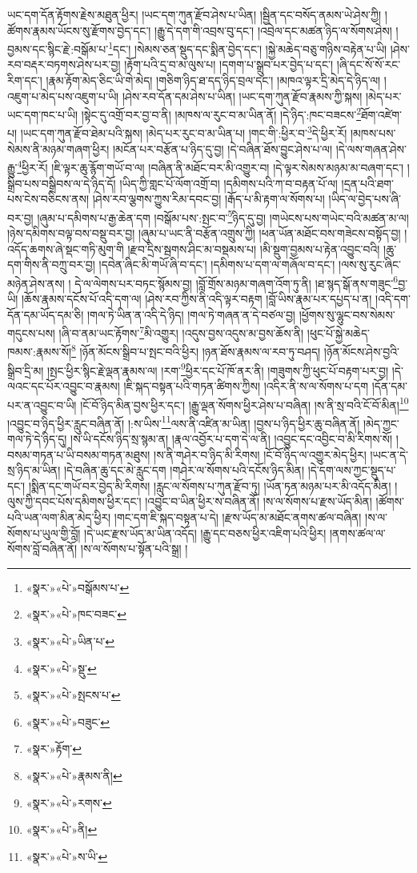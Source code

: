 ཡང་དག་དོན་རྟོགས་རྗེས་མཐུན་ཕྱིར། །ཡང་དག་ཀུན་རྫོབ་ཤེས་པ་ཡིན། །སྦྱིན་དང་བསོད་ནམས་ཡེ་ཤེས་ཀྱི། །ཚོགས་རྣམས་ཡོངས་སུ་རྫོགས་བྱེད་དང་། །རྒྱུ་དེ་དག་གི་འབྲས་བུ་དང་། །འབྲེལ་དང་མཚན་ཉིད་ལ་སོགས་ཤེས། །བྱམས་དང་སྙིང་རྗེ་:བསྒོམ་པ་\footnote{«སྣར་»«པེ་»བསྒོམས་པ་}དང་། །སེམས་ཅན་སྡུད་དང་སྨིན་བྱེད་དང་། །སྐྱེ་མཆེད་བཅུ་གཉིས་བརྟེན་པ་ཡི། །ཤེས་རབ་བརྡར་བཏགས་ཤེས་པར་བྱ། །རྟོག་པའི་དྲ་བ་མ་ལུས་པ། །དགག་པ་སྒྲུབ་པར་བྱེད་པ་དང་། །ཞི་དང་སོ་སོ་རང་རིག་དང་། །རྣམ་རྟོག་མེད་ཅིང་ཡི་གེ་མེད། །གཅིག་ཉིད་ཐ་དད་ཉིད་བྲལ་དང་། །མཁའ་ལྟར་དྲི་མེད་དེ་ཉིད་ལ། །འཇུག་པ་མེད་པས་འཇུག་པ་ཡི། །ཤེས་རབ་དོན་དམ་ཤེས་པ་ཡིན། །ཡང་དག་ཀུན་རྫོབ་རྣམས་ཀྱི་སྐས། །མེད་པར་ཡང་དག་ཁང་པ་ཡི། །སྟེང་དུ་འགྲོ་བར་བྱ་བ་ནི། །མཁས་ལ་རུང་བ་མ་ཡིན་ནོ། །དེ་ཉིད་:ཁང་བཟངས་\footnote{«སྣར་»«པེ་»ཁང་བཟང་}ཐོག་འཛེག་པ། །ཡང་དག་ཀུན་རྫོབ་ཐེམ་པའི་སྐས། །མེད་པར་རུང་བ་མ་ཡིན་པ། །གང་གི་:ཕྱིར་བ་\footnote{«སྣར་»«པེ་»ཡིན་པ་}དེ་ཕྱིར་རོ། །མཁས་པས་སེམས་ནི་མཉམ་གཞག་ཕྱིར། །མངོན་པར་བརྩོན་པ་ཉིད་དུ་བྱ། །དེ་བཞིན་ཐོས་བྱུང་ཤེས་པ་ལ། །དེ་ལས་གཞན་ཤེས་རྒྱུ་\footnote{«སྣར་»«པེ་»སྡུ་}ཕྱིར་རོ། །ཇི་ལྟར་ཆུ་རྙོག་གཡོ་བ་ལ། །བཞིན་ནི་མཐོང་བར་མི་འགྱུར་བ། །དེ་ལྟར་སེམས་མཉམ་མ་བཞག་དང་། །སྒྲིབ་པས་བསྒྲིབས་ལ་དེ་ཉིད་དོ། །ཡིད་ཀྱི་གླང་པོ་ལོག་འགྲོ་བ། །དམིགས་པའི་ཀ་བ་བརྟན་པོ་ལ། །དྲན་པའི་ཐག་པས་ངེས་བཅིངས་ནས། །ཤེས་རབ་ལྕགས་ཀྱུས་རིམ་དབང་བྱ། །རྒོད་པ་མི་རྟག་ལ་སོགས་པ། །ཡིད་ལ་བྱེད་པས་ཞི་བར་བྱ། །ཞུམ་པ་དམིགས་པ་རྒྱ་ཆེན་དག །བསྒོམ་པས་:སྤང་བ་\footnote{«སྣར་»«པེ་»སྤངས་པ་}ཉིད་དུ་བྱ། །གཡེངས་པས་གཡེང་བའི་མཚན་མ་ལ། །ཉེས་དམིགས་བལྟ་བས་བསྡུ་བར་བྱ། །ཞུམ་པ་ཡང་ནི་བརྩོན་འགྲུས་ཀྱི། །ཕན་ཡོན་མཐོང་བས་གཟེངས་བསྟོད་བྱ། །འདོད་ཆགས་ཞེ་སྡང་གཏི་མུག་གི །རྫབ་དྲིས་སྦགས་ཤིང་མ་བསྡམས་པ། །མི་སྡུག་བྱམས་པ་རྟེན་འབྱུང་བའི། །ཆུ་དག་གིས་ནི་བཀྲུ་བར་བྱ། །དབེན་ཞིང་མི་གཡོ་ཞི་བ་དང་། །དམིགས་པ་དག་ལ་གཞོལ་བ་དང་། །ལས་སུ་རུང་ཞིང་མཉེན་ཤེས་ནས། །
དེ་ལ་ལེགས་པར་བཏང་སྙོམས་བྱ། །བློ་གྲོས་མཉམ་གཞག་འོག་ཏུ་ནི། །ཐ་སྙད་སྒོ་ནས་གཟུང་\footnote{«སྣར་»«པེ་»བཟུང་}བྱ་ཡི། །ཆོས་རྣམས་དངོས་པོ་འདི་དག་ལ། །ཤེས་རབ་ཀྱིས་ནི་འདི་ལྟར་བརྟག །བློ་ཡིས་རྣམ་པར་དཔྱད་པ་ན། །འདི་དག་དོན་དམ་ཡོད་དམ་ཅི། །གལ་ཏེ་ཡིན་ན་འདི་དེ་ཉིད། །གལ་ཏེ་གཞན་ན་དེ་བཙལ་བྱ། །ཕྱོགས་སུ་ལྷུང་བས་སེམས་གདུངས་པས། །ཞི་བ་ནམ་ཡང་རྟོགས་\footnote{«སྣར་»རྟོག་}མི་འགྱུར། །འདུས་བྱས་འདུས་མ་བྱས་ཆོས་ནི། །ཕུང་པོ་སྐྱེ་མཆེད་ཁམས་:རྣམས་སོ།\footnote{«སྣར་»«པེ་»རྣམས་ནི།} །ཉོན་མོངས་སྒྲིབ་པ་སྤང་བའི་ཕྱིར། །ཉན་ཐོས་རྣམས་ལ་རབ་ཏུ་བཤད། །ཉོན་མོངས་ཤེས་བྱའི་སྒྲིབ་དྲི་མ། །སྤང་ཕྱིར་སྙིང་རྗེ་ལྡན་རྣམས་ལ། །རག་\footnote{«སྣར་»«པེ་»རགས་}ཕྱིར་དང་པོ་ཁོ་ནར་ནི། །གཟུགས་ཀྱི་ཕུང་པོ་བརྟག་པར་བྱ། །དེ་ལའང་དང་པོར་འབྱུང་བ་རྣམས། །ཇི་སྐད་བསྟན་པའི་གཏན་ཚིགས་ཀྱིས། །འདིར་ནི་ས་ལ་སོགས་པ་དག །དོན་དམ་པར་ན་འབྱུང་བ་ཡི། །ངོ་བོ་ཉིད་མིན་བྱས་ཕྱིར་དང་། །རྒྱུ་ལྡན་སོགས་ཕྱིར་ཤེས་པ་བཞིན། །ས་ནི་སྲ་བའི་ངོ་བོ་མིན།\footnote{«སྣར་»«པེ་»ནི།} །འབྱུང་བ་ཉིད་ཕྱིར་རླུང་བཞིན་ནོ། །:ས་ཡིས་\footnote{«སྣར་»«པེ་»ས་ཡི་}ལས་ནི་འཛིན་མ་ཡིན། །བྱས་པ་ཉིད་ཕྱིར་ཆུ་བཞིན་ནོ། །མེད་ཀྱང་གལ་ཏེ་དེ་ཉིད་དུ། །ས་ཡི་དངོས་ཉིད་སྲ་སྙམ་ན། །རྣལ་འབྱོར་པ་དག་དེ་ལ་ནི། །འབྱུང་དང་འབྱིང་བ་མི་རིགས་སོ། །བསམ་གཏན་པ་ཡི་བསམ་གཏན་མཐུས། །ས་ནི་གཤེར་བ་ཉིད་མི་རིགས། །ངོ་བོ་ཉིད་ལ་འགྱུར་མེད་ཕྱིར། །ཡང་ན་དེ་སྲ་ཉིད་མ་ཡིན། །དེ་བཞིན་ཆུ་དང་མེ་རླུང་དག །གཤེར་ལ་སོགས་པའི་དངོས་ཉིད་མིན། །དེ་དག་ལས་ཀྱང་སྡུད་པ་དང་། །སྨིན་དང་གཡོ་བར་བྱེད་མི་རིགས། །རླུང་ལ་སོགས་པ་ཀུན་རྫོབ་ཏུ། །ཡོན་ཏན་མཉམ་པར་མི་འདོད་མིན། །ལུས་ཀྱི་དབང་པོས་དམིགས་ཕྱིར་དང་། །འབྱུང་བ་ཡིན་ཕྱིར་ས་བཞིན་ནོ། །ས་ལ་སོགས་པ་རྫས་ཡོད་མིན། །ཚོགས་པའི་ཡན་ལག་མིན་མེད་ཕྱིར། །གང་དག་ཇི་སྐད་བསྟན་པ་དེ། །རྫས་ཡོད་མ་མཐོང་ནགས་ཚལ་བཞིན། །ས་ལ་སོགས་པ་ཡུལ་གྱི་བློ། །དེ་ཡང་རྫས་ཡོད་མ་ཡིན་འདོད། །རྒྱུ་དང་བཅས་ཕྱིར་འཇིག་པའི་ཕྱིར། །ནགས་ཚལ་ལ་སོགས་བློ་བཞིན་ནོ། །ས་ལ་སོགས་པ་སྟོན་པའི་སྒྲ། །
